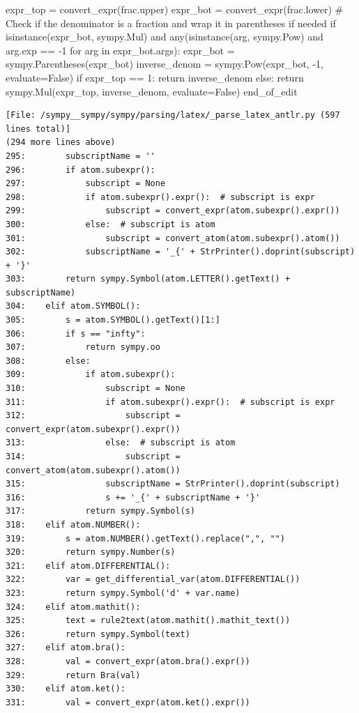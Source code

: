 {\begin{agentbox}
\begin{CodeVerbatim}[breaklines=true, breakanywhere=true]
    expr_top = convert_expr(frac.upper)
    expr_bot = convert_expr(frac.lower)
    # Check if the denominator is a fraction and wrap it in parentheses if needed
    if isinstance(expr_bot, sympy.Mul) and any(isinstance(arg, sympy.Pow) and arg.exp == -1 for arg in expr_bot.args):
        expr_bot = sympy.Parentheses(expr_bot)
    inverse_denom = sympy.Pow(expr_bot, -1, evaluate=False)
    if expr_top == 1:
        return inverse_denom
    else:
        return sympy.Mul(expr_top, inverse_denom, evaluate=False)
end_of_edit
\end{CodeVerbatim}
\end{agentbox}
\begin{observationbox}\begin{Verbatim}[breaklines=true, breakanywhere=true]
[File: /sympy__sympy/sympy/parsing/latex/_parse_latex_antlr.py (597 lines total)]
(294 more lines above)
295:        subscriptName = ''
296:        if atom.subexpr():
297:            subscript = None
298:            if atom.subexpr().expr():  # subscript is expr
299:                subscript = convert_expr(atom.subexpr().expr())
300:            else:  # subscript is atom
301:                subscript = convert_atom(atom.subexpr().atom())
302:            subscriptName = '_{' + StrPrinter().doprint(subscript) + '}'
303:        return sympy.Symbol(atom.LETTER().getText() + subscriptName)
304:    elif atom.SYMBOL():
305:        s = atom.SYMBOL().getText()[1:]
306:        if s == "infty":
307:            return sympy.oo
308:        else:
309:            if atom.subexpr():
310:                subscript = None
311:                if atom.subexpr().expr():  # subscript is expr
312:                    subscript = convert_expr(atom.subexpr().expr())
313:                else:  # subscript is atom
314:                    subscript = convert_atom(atom.subexpr().atom())
315:                subscriptName = StrPrinter().doprint(subscript)
316:                s += '_{' + subscriptName + '}'
317:            return sympy.Symbol(s)
318:    elif atom.NUMBER():
319:        s = atom.NUMBER().getText().replace(",", "")
320:        return sympy.Number(s)
321:    elif atom.DIFFERENTIAL():
322:        var = get_differential_var(atom.DIFFERENTIAL())
323:        return sympy.Symbol('d' + var.name)
324:    elif atom.mathit():
325:        text = rule2text(atom.mathit().mathit_text())
326:        return sympy.Symbol(text)
327:    elif atom.bra():
328:        val = convert_expr(atom.bra().expr())
329:        return Bra(val)
330:    elif atom.ket():
331:        val = convert_expr(atom.ket().expr())

\end{Verbatim}
\end{observationbox}}
